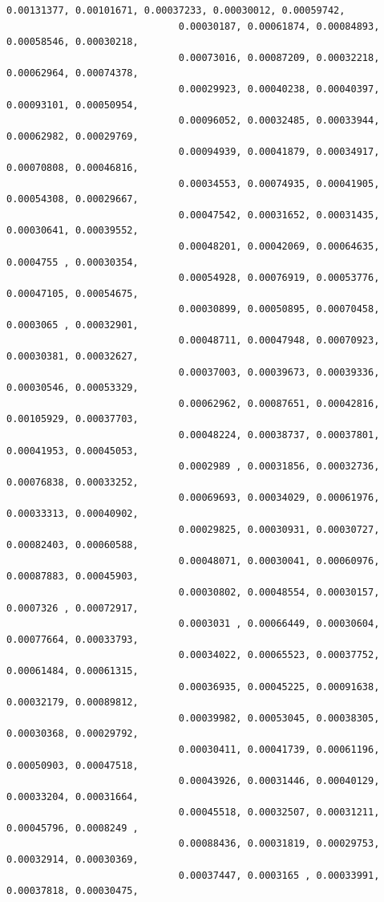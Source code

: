 \documentclass[11pt]{article}
\begin{document}
\begin{Verbatim}[commandchars=\\\{\}]
                              0.00131377, 0.00101671, 0.00037233, 0.00030012, 0.00059742,
                              0.00030187, 0.00061874, 0.00084893, 0.00058546, 0.00030218,
                              0.00073016, 0.00087209, 0.00032218, 0.00062964, 0.00074378,
                              0.00029923, 0.00040238, 0.00040397, 0.00093101, 0.00050954,
                              0.00096052, 0.00032485, 0.00033944, 0.00062982, 0.00029769,
                              0.00094939, 0.00041879, 0.00034917, 0.00070808, 0.00046816,
                              0.00034553, 0.00074935, 0.00041905, 0.00054308, 0.00029667,
                              0.00047542, 0.00031652, 0.00031435, 0.00030641, 0.00039552,
                              0.00048201, 0.00042069, 0.00064635, 0.0004755 , 0.00030354,
                              0.00054928, 0.00076919, 0.00053776, 0.00047105, 0.00054675,
                              0.00030899, 0.00050895, 0.00070458, 0.0003065 , 0.00032901,
                              0.00048711, 0.00047948, 0.00070923, 0.00030381, 0.00032627,
                              0.00037003, 0.00039673, 0.00039336, 0.00030546, 0.00053329,
                              0.00062962, 0.00087651, 0.00042816, 0.00105929, 0.00037703,
                              0.00048224, 0.00038737, 0.00037801, 0.00041953, 0.00045053,
                              0.0002989 , 0.00031856, 0.00032736, 0.00076838, 0.00033252,
                              0.00069693, 0.00034029, 0.00061976, 0.00033313, 0.00040902,
                              0.00029825, 0.00030931, 0.00030727, 0.00082403, 0.00060588,
                              0.00048071, 0.00030041, 0.00060976, 0.00087883, 0.00045903,
                              0.00030802, 0.00048554, 0.00030157, 0.0007326 , 0.00072917,
                              0.0003031 , 0.00066449, 0.00030604, 0.00077664, 0.00033793,
                              0.00034022, 0.00065523, 0.00037752, 0.00061484, 0.00061315,
                              0.00036935, 0.00045225, 0.00091638, 0.00032179, 0.00089812,
                              0.00039982, 0.00053045, 0.00038305, 0.00030368, 0.00029792,
                              0.00030411, 0.00041739, 0.00061196, 0.00050903, 0.00047518,
                              0.00043926, 0.00031446, 0.00040129, 0.00033204, 0.00031664,
                              0.00045518, 0.00032507, 0.00031211, 0.00045796, 0.0008249 ,
                              0.00088436, 0.00031819, 0.00029753, 0.00032914, 0.00030369,
                              0.00037447, 0.0003165 , 0.00033991, 0.00037818, 0.00030475,

\end{Verbatim}
\end{document}
